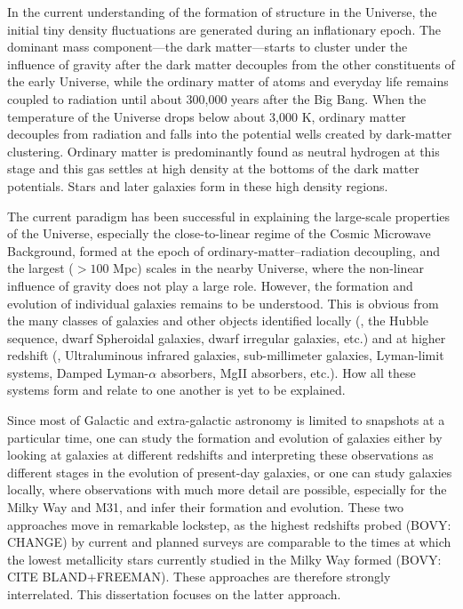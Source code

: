 In the current understanding of the formation of structure in the
Universe, the initial tiny density fluctuations are generated during an
inflationary epoch. The dominant mass component---the dark
matter---starts to cluster under the influence of gravity after the
dark matter decouples from the other constituents of the early
Universe, while the ordinary matter of atoms and everyday life remains
coupled to radiation until about 300,000 years after the Big
Bang. When the temperature of the Universe drops below about 3,000 K,
ordinary matter decouples from radiation and falls into the potential
wells created by dark-matter clustering. Ordinary matter is
predominantly found as neutral hydrogen at this stage and this gas
settles at high density at the bottoms of the dark matter
potentials. Stars and later galaxies form in these high density regions.

The current paradigm has been successful in explaining the large-scale
properties of the Universe, especially the close-to-linear regime of
the Cosmic Microwave Background, formed at the epoch of
ordinary-matter--radiation decoupling, and the largest ($> 100$ Mpc)
scales in the nearby Universe, where the non-linear influence of
gravity does not play a large role. However, the formation and
evolution of individual galaxies remains to be understood. This is
obvious from the many classes of galaxies and other objects identified
locally (\eg, the Hubble sequence, dwarf Spheroidal galaxies, dwarf
irregular galaxies, etc.) and at higher redshift (\eg, Ultraluminous
infrared galaxies, sub-millimeter galaxies, Lyman-limit systems,
Damped Lyman-$\alpha$ absorbers, MgII absorbers, etc.). How all these
systems form and relate to one another is yet to be explained.

Since most of Galactic and extra-galactic astronomy is limited to
snapshots at a particular time, one can study the formation and
evolution of galaxies either by looking at galaxies at different
redshifts and interpreting these observations as different stages in
the evolution of present-day galaxies, or one can study galaxies
locally, where observations with much more detail are possible,
especially for the Milky Way and M31, and infer their formation and
evolution. These two approaches move in remarkable lockstep, as the
highest redshifts probed (BOVY: CHANGE) by current and planned surveys
are comparable to the times at which the lowest metallicity stars
currently studied in the Milky Way formed (BOVY: CITE
BLAND+FREEMAN). These approaches are therefore strongly
interrelated. This dissertation focuses on the latter approach.

